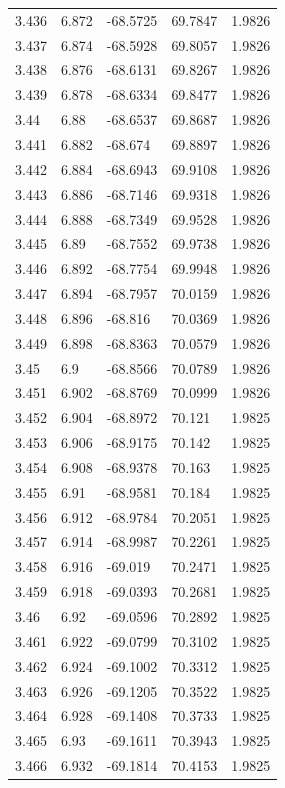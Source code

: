 \begin{tabular}{lllll}
3.436 & 6.872 & -68.5725 & 69.7847 & 1.9826 \\
3.437 & 6.874 & -68.5928 & 69.8057 & 1.9826 \\
3.438 & 6.876 & -68.6131 & 69.8267 & 1.9826 \\
3.439 & 6.878 & -68.6334 & 69.8477 & 1.9826 \\
3.44 & 6.88 & -68.6537 & 69.8687 & 1.9826 \\
3.441 & 6.882 & -68.674 & 69.8897 & 1.9826 \\
3.442 & 6.884 & -68.6943 & 69.9108 & 1.9826 \\
3.443 & 6.886 & -68.7146 & 69.9318 & 1.9826 \\
3.444 & 6.888 & -68.7349 & 69.9528 & 1.9826 \\
3.445 & 6.89 & -68.7552 & 69.9738 & 1.9826 \\
3.446 & 6.892 & -68.7754 & 69.9948 & 1.9826 \\
3.447 & 6.894 & -68.7957 & 70.0159 & 1.9826 \\
3.448 & 6.896 & -68.816 & 70.0369 & 1.9826 \\
3.449 & 6.898 & -68.8363 & 70.0579 & 1.9826 \\
3.45 & 6.9 & -68.8566 & 70.0789 & 1.9826 \\
3.451 & 6.902 & -68.8769 & 70.0999 & 1.9826 \\
3.452 & 6.904 & -68.8972 & 70.121 & 1.9825 \\
3.453 & 6.906 & -68.9175 & 70.142 & 1.9825 \\
3.454 & 6.908 & -68.9378 & 70.163 & 1.9825 \\
3.455 & 6.91 & -68.9581 & 70.184 & 1.9825 \\
3.456 & 6.912 & -68.9784 & 70.2051 & 1.9825 \\
3.457 & 6.914 & -68.9987 & 70.2261 & 1.9825 \\
3.458 & 6.916 & -69.019 & 70.2471 & 1.9825 \\
3.459 & 6.918 & -69.0393 & 70.2681 & 1.9825 \\
3.46 & 6.92 & -69.0596 & 70.2892 & 1.9825 \\
3.461 & 6.922 & -69.0799 & 70.3102 & 1.9825 \\
3.462 & 6.924 & -69.1002 & 70.3312 & 1.9825 \\
3.463 & 6.926 & -69.1205 & 70.3522 & 1.9825 \\
3.464 & 6.928 & -69.1408 & 70.3733 & 1.9825 \\
3.465 & 6.93 & -69.1611 & 70.3943 & 1.9825 \\
3.466 & 6.932 & -69.1814 & 70.4153 & 1.9825 \\

\end{tabular}

